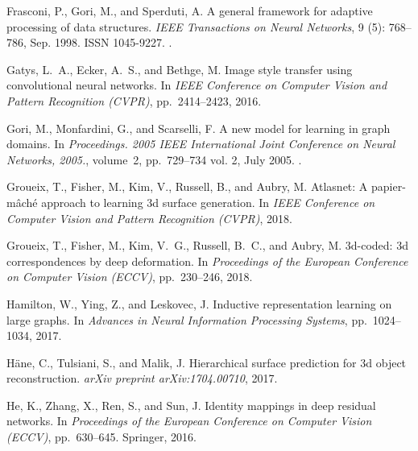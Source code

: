 \documentclass{article}
\begin{document}
\begin{thebibliography}{59}
Frasconi, P., Gori, M., and Sperduti, A.
\newblock A general framework for adaptive processing of data structures.
\newblock \emph{IEEE Transactions on Neural Networks}, 9 (5):
  768--786, Sep. 1998.
\newblock ISSN 1045-9227.
\newblock {}.

Gatys, L.~A., Ecker, A.~S., and Bethge, M.
\newblock Image style transfer using convolutional neural networks.
\newblock In \emph{IEEE Conference on Computer Vision and Pattern Recognition
  (CVPR)}, pp.\  2414--2423, 2016.

Gori, M., Monfardini, G., and Scarselli, F.
\newblock A new model for learning in graph domains.
\newblock In \emph{Proceedings. 2005 IEEE International Joint Conference on
  Neural Networks, 2005.}, volume~2, pp.\  729--734 vol. 2, July 2005.
\newblock {}.

Groueix, T., Fisher, M., Kim, V., Russell, B., and Aubry, M.
\newblock Atlasnet: A papier-m{\^a}ch{\'e} approach to learning 3d surface
  generation.
\newblock In \emph{IEEE Conference on Computer Vision and Pattern Recognition
  (CVPR)}, 2018{}.

Groueix, T., Fisher, M., Kim, V.~G., Russell, B.~C., and Aubry, M.
\newblock 3d-coded: 3d correspondences by deep deformation.
\newblock In \emph{Proceedings of the European Conference on Computer Vision
  (ECCV)}, pp.\  230--246, 2018{}.

Hamilton, W., Ying, Z., and Leskovec, J.
\newblock Inductive representation learning on large graphs.
\newblock In \emph{Advances in Neural Information Processing Systems}, pp.\
  1024--1034, 2017.

H{\"a}ne, C., Tulsiani, S., and Malik, J.
\newblock Hierarchical surface prediction for 3d object reconstruction.
\newblock \emph{arXiv preprint arXiv:1704.00710}, 2017.

He, K., Zhang, X., Ren, S., and Sun, J.
\newblock Identity mappings in deep residual networks.
\newblock In \emph{Proceedings of the European Conference on Computer Vision
  (ECCV)}, pp.\  630--645. Springer, 2016.


\end{thebibliography}
\end{document}
